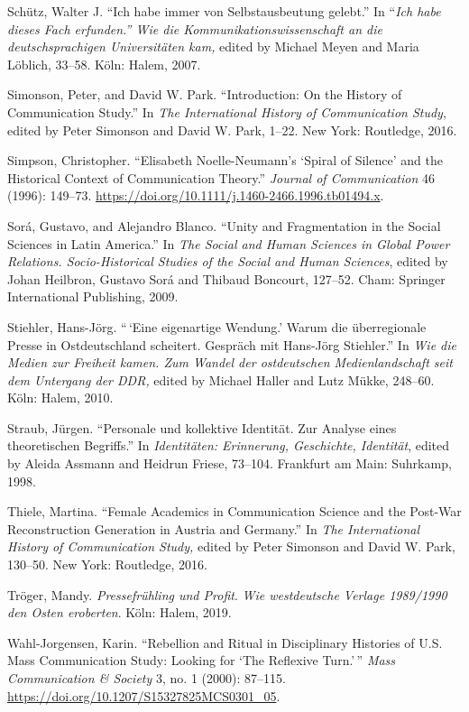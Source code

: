 \documentclass{tufte-handout}
\begin{document}
\begin{hangparas}{.25in}{1}
Schütz, Walter J. ``Ich habe immer von Selbstausbeutung gelebt.'' In
``\emph{Ich habe dieses Fach erfunden.'' Wie die
Kommunikationswissenschaft an die deutschsprachigen Universitäten kam,}
edited by Michael Meyen and Maria Löblich, 33--58. Köln: Halem, 2007.

Simonson, Peter, and David W. Park. ``Introduction: On the History of
Communication Study.'' In \emph{The International History of
Communication Study}, edited by Peter Simonson and David W. Park, 1--22.
New York: Routledge, 2016.

Simpson, Christopher. ``Elisabeth Noelle-Neumann's `Spiral of Silence'
and the Historical Context of Communication Theory.'' \emph{Journal of
Communication} 46 (1996): 149--73.
\url{https://doi.org/10.1111/j.1460-2466.1996.tb01494.x}.

Sorá, Gustavo, and Alejandro Blanco. ``Unity and Fragmentation in the
Social Sciences in Latin America.'' In \emph{The Social and Human
Sciences in Global Power Relations. Socio-Historical Studies of the
Social and Human Sciences}, edited by Johan Heilbron, Gustavo Sorá and
Thibaud Boncourt, 127--52. Cham: Springer International Publishing,
2009.

Stiehler, Hans-Jörg. ``\,`Eine eigenartige Wendung.' Warum die
überregionale Presse in Ostdeutschland scheitert. Gespräch mit Hans-Jörg
Stiehler.'' In \emph{Wie die Medien zur Freiheit kamen. Zum Wandel der
ostdeutschen Medienlandschaft seit dem Untergang der DDR,} edited by
Michael Haller and Lutz Mükke, 248--60. Köln: Halem, 2010.

Straub, Jürgen. ``Personale und kollektive Identität. Zur Analyse eines
theoretischen Begriffs.'' In \emph{Identitäten: Erinnerung, Geschichte,
Identität}, edited by Aleida Assmann and Heidrun Friese, 73--104.
Frankfurt am Main: Suhrkamp, 1998.

Thiele, Martina. ``Female Academics in Communication Science and the
Post-War Reconstruction Generation in Austria and Germany.'' In
\emph{The International History of Communication Study,} edited by Peter
Simonson and David W. Park, 130--50. New York: Routledge, 2016.

Tröger, Mandy. \emph{Pressefrühling und Profit}. \emph{Wie westdeutsche
Verlage 1989/1990 den Osten eroberten}. Köln: Halem, 2019.

Wahl-Jorgensen, Karin. ``Rebellion and Ritual in Disciplinary Histories
of U.S. Mass Communication Study: Looking for `The Reflexive Turn.'\,''
\emph{Mass Communication \& Society} 3, no. 1 (2000): 87--115.
\url{https://doi.org/10.1207/S15327825MCS0301_05}.


\end{hangparas}
\end{document}

